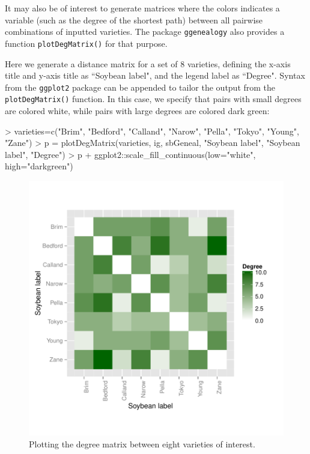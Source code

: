 \documentclass{article}
\numberwithin{equation}{section} %
\newcommand{\pkg}[1]{{\texttt{#1}}}
\begin{document}
It may also be of interest to generate matrices where the colors indicates a variable (such as the degree of the shortest path) between all pairwise combinations of inputted varieties. The package \pkg{ggenealogy} also provides a function \texttt{plotDegMatrix()} for that purpose.

Here we generate a distance matrix for a set of 8 varieties, defining the x-axis title and y-axis title as ``Soybean label", and the legend label as ``Degree". Syntax from the \texttt{ggplot2} package can be appended to tailor the output from the \texttt{plotDegMatrix()} function. In this case, we specify that pairs with small degrees are colored white, while pairs with large degrees are colored dark green:

\begin{Schunk}
\begin{Sinput}
> varieties=c("Brim", "Bedford", "Calland", "Narow", "Pella", "Tokyo", "Young", "Zane")
> p = plotDegMatrix(varieties, ig, sbGeneal, "Soybean label", "Soybean label", "Degree")
> p + ggplot2::scale_fill_continuous(low="white", high="darkgreen")
\end{Sinput}
\end{Schunk}

\begin{figure} 
  \begin{center} 
\includegraphics{ggenealogy-plotDegMatrix1}
\end{center} 
\caption{Plotting the degree matrix between eight varieties of interest.}
\label{fig:plotDegMatrix1}
\end{figure}
\end{document}
